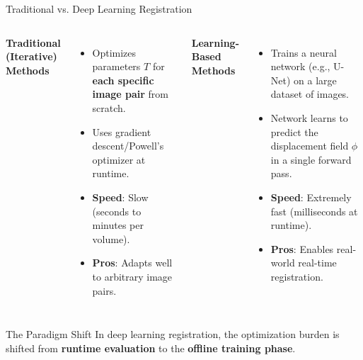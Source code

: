 \documentclass[aspectratio=169,10pt]{beamer}
\begin{document}
\begin{frame}{Traditional vs. Deep Learning Registration}
\begin{columns}[T,onlytextwidth]
\textbf{Traditional (Iterative) Methods}
\begin{itemize}
    \item Optimizes parameters $T$ for \textbf{each specific image pair} from scratch.
    \item Uses gradient descent/Powell's optimizer at runtime.
    \item \textbf{Speed}: Slow (seconds to minutes per volume).
    \item \textbf{Pros}: Adapts well to arbitrary image pairs.
\end{itemize}

\textbf{Learning-Based Methods}
\begin{itemize}
    \item Trains a neural network (e.g., U-Net) on a large dataset of images.
    \item Network learns to predict the displacement field $\phi$ in a single forward pass.
    \item \textbf{Speed}: Extremely fast (milliseconds at runtime).
    \item \textbf{Pros}: Enables real-world real-time registration.
\end{itemize}
\end{columns}

\vspace{0.5em}
\begin{block}{The Paradigm Shift}
In deep learning registration, the optimization burden is shifted from \textbf{runtime evaluation} to the \textbf{offline training phase}.
\end{block}
\end{frame}
\end{document}
